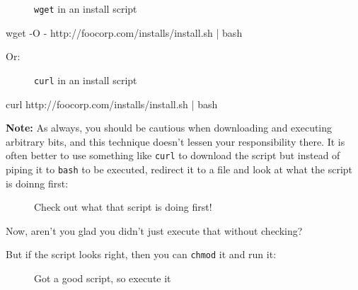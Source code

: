 \documentclass[10pt,american,]{book}
\newenvironment{Shaded}{\begin{snugshade}}{\end{snugshade}}
\newcommand{\KeywordTok}[1]{\textcolor[rgb]{0.13,0.29,0.53}{\textbf{{#1}}}}
\newcommand{\CommentTok}[1]{\textcolor[rgb]{0.56,0.35,0.01}{\textit{{#1}}}}
\newcommand{\NormalTok}[1]{{#1}}
\numberwithin{figure}{chapter}
\DeclareRobustCommand{\drcap}[1]{\begin{figure}[H]\caption{#1}\end{figure}}
\renewcommand{\KeywordTok}[1]{{#1}}
\renewcommand{\CommentTok}[1]{{#1}}
\renewcommand{\NormalTok}[1]{{#1}}
\begin{document}
\drcap{\texttt{wget} in an install script}

\begin{Shaded}
\begin{Highlighting}[]
\KeywordTok{wget} \NormalTok{-O - http://foocorp.com/installs/install.sh }\KeywordTok{|} \KeywordTok{bash}
\end{Highlighting}
\end{Shaded}

Or:

\drcap{\texttt{curl} in an install script}

\begin{Shaded}
\begin{Highlighting}[]
\KeywordTok{curl} \NormalTok{http://foocorp.com/installs/install.sh }\KeywordTok{|} \KeywordTok{bash}
\end{Highlighting}
\end{Shaded}

\textbf{Note:} As always, you should be cautious when downloading and
executing arbitrary bits, and this technique doesn't lessen your
responsibility there. It is often better to use something like
\texttt{curl} to download the script but instead of piping it to
\texttt{bash} to be executed, redirect it to a file and look at what the
script is doinng first:

\drcap{Check out what that script is doing first!}

\begin{Shaded}
\end{Shaded}

Now, aren't you glad you didn't just execute that without checking?

But if the script looks right, then you can \texttt{chmod} it and run
it:

\drcap{Got a good script, so execute it}

\begin{Shaded}
\end{Shaded}
\end{document}
